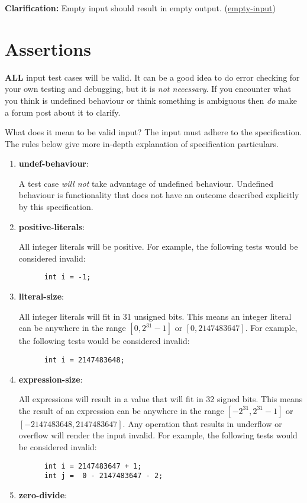 \documentclass{article}
\newcommand{\assertiondest}[1]{\hypertarget{#1}{\textbf{#1}:}}
\newcommand{\clarification}[2]{\textbf{Clarification: }#1 (\hyperlink{#2}{#2})}
\begin{document}
\clarification{Empty input should result in empty output.}{empty-input}

\section{Assertions}
\textbf{ALL} input test cases will be valid. It can be a good idea to do error checking for your
own testing and debugging, but it is \textit{not necessary}. If you encounter what you think is
undefined behaviour or think something is ambiguous then \textit{do} make a forum post about it to
clarify.

What does it mean to be valid input? The input must adhere to the specification. The rules below
give more in-depth explanation of specification particulars.
\begin{enumerate}
  \item
    \assertiondest{undef-behaviour}
    A test case \textit{will not} take advantage of undefined behaviour. Undefined behaviour is
    functionality that does not have an outcome described explicitly by this specification.
  \item
    \assertiondest{positive-literals}
    All integer literals will be positive. For example, the following tests would be considered
    invalid:
    \begin{lstlisting}
      int i = -1;
    \end{lstlisting}
  \item
    \assertiondest{literal-size}
    All integer literals will fit in 31 unsigned bits. This means an integer literal can be
    anywhere in the range $[0, 2^{31} - 1]$ or $[0, 2147483647]$. For example, the following tests
    would be considered invalid:
    \begin{lstlisting}
      int i = 2147483648;
    \end{lstlisting}
  \item
    \assertiondest{expression-size}
    All expressions will result in a value that will fit in 32 signed bits. This means the result
    of an expression can be anywhere in the range $[-2^{31}, 2^{31} - 1]$ or $[-2147483648,
    2147483647]$. Any operation that results in underflow or overflow will render the input
    invalid. For example, the following tests would be considered invalid:
    \begin{lstlisting}
      int i = 2147483647 + 1;
      int j =  0 - 2147483647 - 2;
    \end{lstlisting}
  \item
    \assertiondest{zero-divide}

\end{enumerate}
\end{document}
